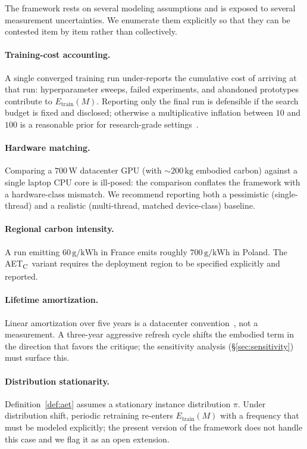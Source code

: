 \documentclass[11pt]{article}
\newcommand{\AETC}{AET\textsubscript{C}}
\begin{document}
The framework rests on several modeling assumptions and is exposed to several measurement uncertainties. We enumerate them explicitly so that they can be contested item by item rather than collectively.

\paragraph{Training-cost accounting.} A single converged training run
under-reports the cumulative cost of arriving at that run: hyperparameter sweeps, failed experiments, and abandoned prototypes contribute to \(E_\text{train}(M)\). Reporting only the final run is defensible if the search budget is fixed and disclosed; otherwise a multiplicative inflation between \(10\) and \(100\) is a reasonable prior for research-grade settings~\cite{strubell2019energy,henderson2020systematic}.

\paragraph{Hardware matching.} Comparing a \(700\,\mathrm{W}\)
datacenter GPU (with \(\sim\!200\,\mathrm{kg}\) embodied carbon) against a single laptop CPU core is ill-posed: the comparison conflates the framework with a hardware-class mismatch. We recommend reporting both a pessimistic (single-thread) and a realistic (multi-thread, matched device-class) baseline.

\paragraph{Regional carbon intensity.} A run emitting
\(60\,\mathrm{g/kWh}\) in France emits roughly \(700\,\mathrm{g/kWh}\) in Poland. The \AETC\ variant requires the deployment region to be specified explicitly and reported.

\paragraph{Lifetime amortization.} Linear amortization over five years
is a datacenter convention~\cite{shehabi2016datacenter}, not a measurement. A three-year aggressive refresh cycle shifts the embodied term in the direction that favors the critique; the sensitivity analysis (\S\ref{sec:sensitivity}) must surface this.

\paragraph{Distribution stationarity.} Definition~\ref{def:aet}
assumes a stationary instance distribution \(\pi\). Under distribution shift, periodic retraining re-enters \(E_\text{train}(M)\) with a frequency that must be modeled explicitly; the present version of the framework does not handle this case and we flag it as an open extension.
\end{document}
